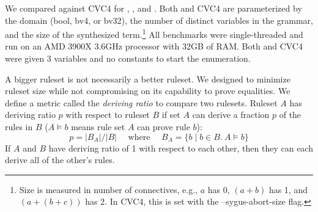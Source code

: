 


We compared  against CVC4
 for \booleans, \bfour, and \bthreetwo.
Both  and CVC4
 are parameterized by the domain
 (bool, bv4, or bv32),
 the number of distinct variables in the grammar,
 and the size of the synthesized term.\footnote{
   Size is measured in number of connectives,
   e.g., $a$ has 0, $(a + b)$ has 1,
   and $(a + (b + c))$ has 2.
   In CVC4, this is set with the
   \textsf{--sygus-abort-size} flag.
 }
All benchmarks were single-threaded
 and run on an
 AMD 3900X 3.6GHz processor with 32GB of RAM.
Both  and CVC4 were given 3 variables
 and no constants to start the enumeration.

A bigger ruleset is not necessarily a better ruleset.
We designed  to minimize ruleset size
 while not compromising on
 its capability to prove equalities.
We define a metric called the \textit{deriving ratio}
 to compare two rulesets.
Ruleset $A$ has deriving ratio $p$ with respect to ruleset $B$
 if set $A$ can derive a fraction $p$ of the rules in $B$
 ($A \vDash b$ means rule set $A$ can prove rule $b$):
$$p = |B_A| / |B| \quad\textrm{ where }\quad B_A = \{b \mid b \in B.\ A \vDash b\}$$
If $A$ and $B$ have deriving ratio of 1 with respect to each other,
  then they can each derive all of the other's rules.

